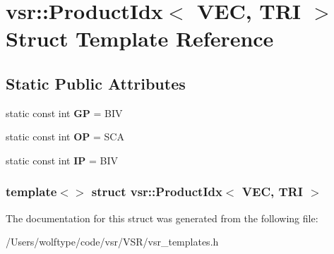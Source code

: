 \hypertarget{structvsr_1_1_product_idx_3_01_v_e_c_00_01_t_r_i_01_4}{\section{vsr\-:\-:Product\-Idx$<$ V\-E\-C, T\-R\-I $>$ Struct Template Reference}
\label{structvsr_1_1_product_idx_3_01_v_e_c_00_01_t_r_i_01_4}
}
\subsection*{Static Public Attributes}
\begin{DoxyCompactItemize}
\item 
\hypertarget{structvsr_1_1_product_idx_3_01_v_e_c_00_01_t_r_i_01_4_a75cc1a9d855a21456ee30bbfbf76c893}{static const int {\bfseries G\-P} = B\-I\-V}\label{structvsr_1_1_product_idx_3_01_v_e_c_00_01_t_r_i_01_4_a75cc1a9d855a21456ee30bbfbf76c893}

\item 
\hypertarget{structvsr_1_1_product_idx_3_01_v_e_c_00_01_t_r_i_01_4_aa1c3c9865953bce59b53781953f2dc01}{static const int {\bfseries O\-P} = S\-C\-A}\label{structvsr_1_1_product_idx_3_01_v_e_c_00_01_t_r_i_01_4_aa1c3c9865953bce59b53781953f2dc01}

\item 
\hypertarget{structvsr_1_1_product_idx_3_01_v_e_c_00_01_t_r_i_01_4_a110750e839534553f76f73adffba90d4}{static const int {\bfseries I\-P} = B\-I\-V}\label{structvsr_1_1_product_idx_3_01_v_e_c_00_01_t_r_i_01_4_a110750e839534553f76f73adffba90d4}

\end{DoxyCompactItemize}
\subsubsection*{template$<$$>$ struct vsr\-::\-Product\-Idx$<$ V\-E\-C, T\-R\-I $>$}



The documentation for this struct was generated from the following file\-:\begin{DoxyCompactItemize}
\item 
/\-Users/wolftype/code/vsr/\-V\-S\-R/vsr\-\_\-templates.\-h\end{DoxyCompactItemize}

